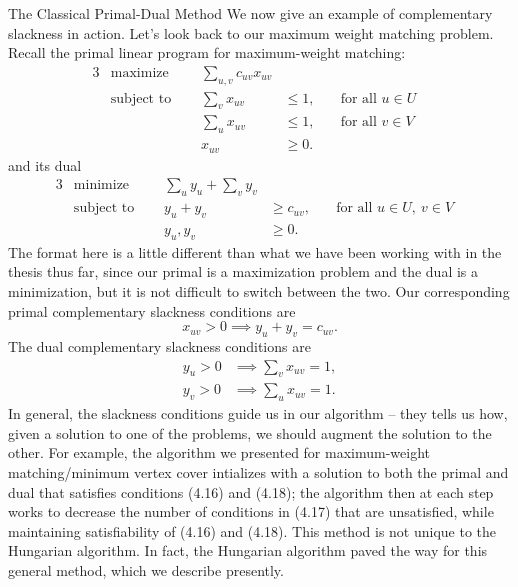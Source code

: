 \begin{section}{The Classical Primal-Dual Method}
	We now give an example of complementary slackness in action. Let's look back to our maximum 
	weight matching problem. Recall the primal linear program for maximum-weight matching:
	\begin{alignat}{3}
		& \text{maximize } & \sum_{u,v} c_{uv} x_{uv}& \\
		& \text{subject to } \quad & \sum_{v} x_{uv} & \leq 1, & \quad \text{for all } u\in U& \\
				     &\quad & \sum_{u} x_{uv} & \leq 1, & \quad \text{for all } 
				     v\in V & \\
				&& x_{uv} & \geq 0.
	\end{alignat}
	and its dual
	\begin{alignat}{3}
		& \text{minimize } & \sum_u y_u + \sum_v y_v& \\
		& \text{subject to } \quad & y_u + y_v & \geq c_{uv}, & \quad \text{for all } 
					u\in U,\ v\in V & \\
				    && y_u,y_v & \geq 0.
	\end{alignat}
	The format here is a little different than what we have been working with in the thesis thus 
	far, since our primal is a maximization problem and the dual 
	is a minimization, but it is not difficult to switch between the two. Our 
	corresponding primal complementary slackness conditions are
	\begin{equation}
		x_{uv} > 0 \implies y_u + y_v = c_{uv}.
	\end{equation}
	The dual complementary slackness conditions are
	\begin{align}
		y_u > 0 &\implies \sum_v x_{uv} = 1,\\
		y_v > 0 &\implies \sum_u x_{uv} = 1.
	\end{align}
	In general, the slackness conditions guide us in our algorithm -- they tells us how, given a 
	solution to one of the problems, we should augment the solution to the other. For example, the 
	algorithm we presented for maximum-weight matching/minimum vertex cover intializes with 
	a solution to both the primal and dual that satisfies conditions (4.16) and (4.18); the algorithm 
	then at each step works to decrease the number of conditions in (4.17) that are unsatisfied, 
	while maintaining satisfiability of (4.16) and (4.18). This method is not unique to the Hungarian 
	algorithm. In fact, the Hungarian algorithm paved the way for this general method, which we 
	describe presently.


\end{section}
